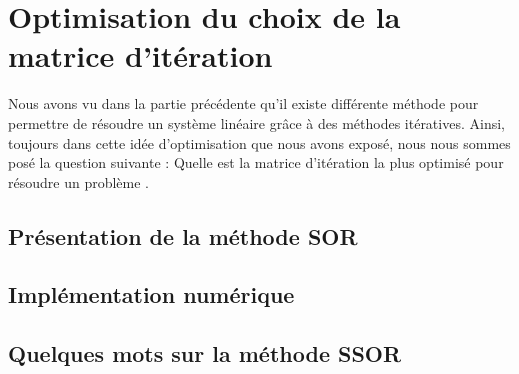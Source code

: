 \chapter{Optimisation du choix de la matrice d'itération}
Nous avons vu dans la partie précédente qu'il existe différente méthode pour permettre de résoudre un système linéaire grâce à des méthodes itératives. Ainsi, toujours dans cette idée d'optimisation que nous avons exposé, nous nous sommes posé la question suivante : \og Quelle est la matrice d'itération la plus optimisé pour résoudre un problème \fg.
\section{Présentation de la méthode SOR}
\section{Implémentation numérique}
\section{Quelques mots sur la méthode SSOR}